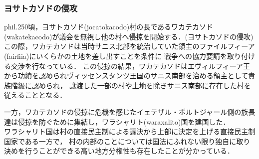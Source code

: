 \documentclass[11pt,a4j]{jarticle}
\begin{document}
\subsubsection{ヨサトカソドの侵攻}
phil.250頃，ヨサトカソド(jocatokacodo)村の長であるワカテカソド(wakatekacodo)が議会を無視し他の村へ侵掠を開始する．(ヨサトカソドの侵攻) \\
この際，ワカテカソドは当時サニス北部を統治していた領主のファイルフィーア(fairfiia)にいくらかの土地を差し出すことを条件に
戦争への協力要請を取り付ける交渉を行なっている．
この侵掠の結果，ワカテカソドはエヴィルフィーア王から功績を認められヴィッセンスタンツ王国のサニス南部を治める領主として貴族階級に認められ，
譲渡した一部の村や土地を除きサニス南部に存在した村を従えることとなる．

一方，ワカテカソドの侵掠に危機を感じたイェテザル・ポルトジャール側の族長達は侵掠を防ぐために集結し，ワラシャリト(waraxalito)国を建国した．\\
ワラシャリト国は村の直接民主制による議決から上部に決定を上げる直接民主制国家である一方で，
村の内部のことについては国法にふれない限り独自に取り決めを行うことができる高い地方分権性も存在したことが分かっている．
\end{document}
